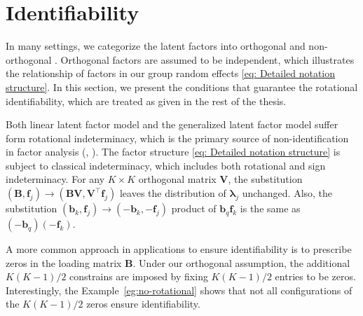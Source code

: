 \section{Identifiability}
\label{sec:identifiability}

In many settings, we categorize the latent factors into orthogonal and non-orthogonal \citep{Cui2026}. Orthogonal factors are assumed to be independent, which illustrates the relationship of factors in our group random effects \eqref{eq: Detailed notation structure}. In this section, we present the conditions that guarantee the rotational identifiability, which are treated as given in the rest of the thesis. 

Both linear latent factor model and the generalized latent factor model suffer form rotational indeterminacy, which is the primary source of non-identification in factor analysis (\citet{BAI2012}, \citet{BAI201318}). The factor structure \eqref{eq: Detailed notation structure} is subject to classical indeterminacy, which includes both rotational and sign indeterminacy. For any $K\times K$ orthogonal matrix $\mathbf{V}$, the substitution $(\mathbf{B},\mathbf{f}_{j})\to (\mathbf{BV},\mathbf{V}^{\top}\mathbf{f}_{j})$ leaves the distribution of $\bm{\lambda}_{j}$ unchanged. Also, the substitution $(\mathbf{b}_{k},\mathbf{f}_{j})\to (-\mathbf{b}_{k},-\mathbf{f}_{j})$ product of $\mathbf{b}_{q}\mathbf{f}_{k}$ is the same as $(-\mathbf{b}_{q})(-\mathbf{f}_{k})$. 

A more common approach in applications to ensure identifiability is to prescribe zeros in the loading matrix $\mathbf{B}$. Under our orthogonal assumption, the additional $K(K-1)/2$ constrains are imposed by fixing $K(K-1)/2$ entries to be zeros. Interestingly, the Example~\eqref{eg:no-rotational} shows that not all configurations of the $K(K-1)/2$ zeros ensure identifiability.

